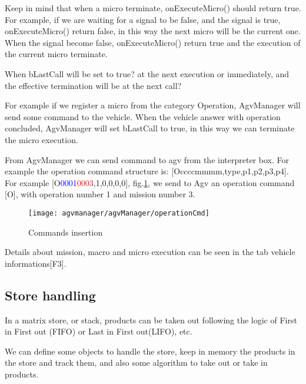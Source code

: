 Keep in mind that when a micro terminate, onExecuteMicro() should return true. For example, if we are waiting for a signal to be false, and the signal is true, onExecuteMicro() return false, in this way the next micro will be the current one.
When the signal become false, onExecuteMicro() return true and the execution of the current micro terminate.

When bLastCall will be set to true? at the next execution or immediately, and the effective termination will be at the next call?

For example if we register a micro from the category Operation, AgvManager will send some command to the vehicle. When the vehicle answer with operation concluded, AgvManager will set bLastCall to true, in this way we can terminate the micro execution.

From AgvManager we can send command to agv from the interpreter box. For example the operation command structure is: [Occccmmmm,type,p1,p2,p3,p4]. For example [O\textcolor{blue}{0001}\textcolor{red}{0003},1,0,0,0,0], fig.\ref{fig:operationCmd}, we send to Agv an operation command [O], with operation number 1 and mission number 3.

\begin{figure}
	\centering\texttt{[image: agvmanager/agvManager/operationCmd]}
	\caption{Commands insertion}
	\label{fig:operationCmd}
\end{figure}

Details about mission, macro and micro execution can be seen in the tab vehicle informations[F3]. 

%
\subsection{Store handling}
In a matrix store, or stack, products can be taken out following the logic of First in First out (FIFO) or Last in First out(LIFO), etc.

We can define some objects to handle the store, keep in memory the products in the store and track them, and also some algorithm to take out or take in products.


%















